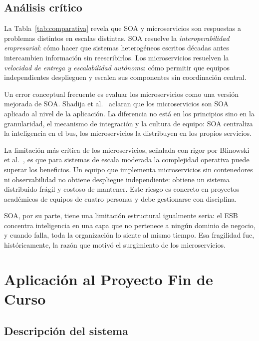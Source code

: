\documentclass[12pt, a4paper]{article}
\begin{document}
\subsection{Análisis crítico}

La Tabla~\ref{tab:comparativa} revela que SOA y microservicios son respuestas a
problemas distintos en escalas distintas. SOA resuelve la \textit{interoperabilidad
empresarial}: cómo hacer que sistemas heterogéneos escritos décadas antes intercambien
información sin reescribirlos. Los microservicios resuelven la \textit{velocidad de
entrega y escalabilidad autónoma}: cómo permitir que equipos independientes
desplieguen y escalen sus componentes sin coordinación central.

Un error conceptual frecuente es evaluar los microservicios como una versión
mejorada de SOA. Shadija et al.~\cite{shadija2017} aclaran que los microservicios
son SOA aplicado al nivel de la aplicación. La diferencia no está en los principios
sino en la granularidad, el mecanismo de integración y la cultura de equipo: SOA
centraliza la inteligencia en el bus, los microservicios la distribuyen en los
propios servicios.

La limitación más crítica de los microservicios, señalada con rigor por Blinowski
et al.~\cite{blinowski2022}, es que para sistemas de escala moderada la complejidad
operativa puede superar los beneficios. Un equipo que implementa microservicios sin
contenedores ni observabilidad no obtiene despliegue independiente: obtiene un
sistema distribuido frágil y costoso de mantener. Este riesgo es concreto en
proyectos académicos de equipos de cuatro personas y debe gestionarse con disciplina.

SOA, por su parte, tiene una limitación estructural igualmente seria: el ESB
concentra inteligencia en una capa que no pertenece a ningún dominio de negocio,
y cuando falla, toda la organización lo siente al mismo tiempo. Esa fragilidad fue,
históricamente, la razón que motivó el surgimiento de los microservicios.

\section{Aplicación al Proyecto Fin de Curso}
\label{sec:pfc}


\subsection{Descripción del sistema}
\end{document}
